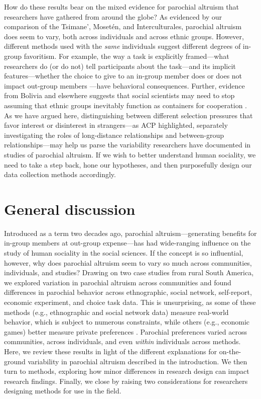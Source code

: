 \documentclass[bibauthoryear]{aa}
\begin{document}
	How do these results bear on the mixed evidence for parochial altruism that researchers have gathered from around the globe? As evidenced by our comparison of the Tsimane', Moset\'en, and Interculturales, parochial altruism does seem to vary, both across individuals and across ethnic groups. However, different methods used with the \emph{same} individuals suggest different degrees of in-group favoritism. For example, the way a task is explicitly framed---what researchers do (or do not) tell participants about the task---and its implicit features---whether the choice to give to an in-group member does or does not impact out-group members \citep{hagen2006game, lightner2017, Pisor2020}---have behavioral consequences. Further, evidence from Bolivia and elsewhere suggests that social scientists may need to stop assuming that ethnic groups inevitably function as containers for cooperation \citep{moya2015different}. As we have argued here, distinguishing between different selection pressures that favor interest or disinterest in strangers---as ACP highlighted, separately investigating the roles of long-distance relationships and  between-group relationships---may help us parse the variability researchers have documented in studies of parochial altruism. If we wish to better understand human sociality, we need to take a step back, hone our hypotheses, and then purposefully design our data collection methods accordingly.



\section{General discussion}
Introduced as a term two decades ago, parochial altruism---generating benefits for in-group members at out-group expense---has had wide-ranging influence on the study of human sociality in the social sciences. If the concept is so influential, however, why does parochial altruism seem to vary so much across communities, individuals, and studies? Drawing on two case studies from rural South America, we explored variation in parochial altruism across communities and found differences in parochial behavior across ethnographic, social network, self-report, economic experiment, and choice task data. This is unsurprising, as some of these methods (e.g., ethnographic and social network data) measure real-world behavior, which is subject to numerous constraints, while others (e.g.,  economic games) better measure private preferences \citep{Pisor2020}. Parochial preferences varied across communities, across individuals, and even \emph{within} individuals across methods. Here, we review these results in light of the different explanations for on-the-ground variability in parochial altruism described in the introduction. We then turn to methods, exploring how minor differences in research design can impact research findings. Finally, we close by raising two considerations for researchers designing methods for use in the field.
\end{document}
